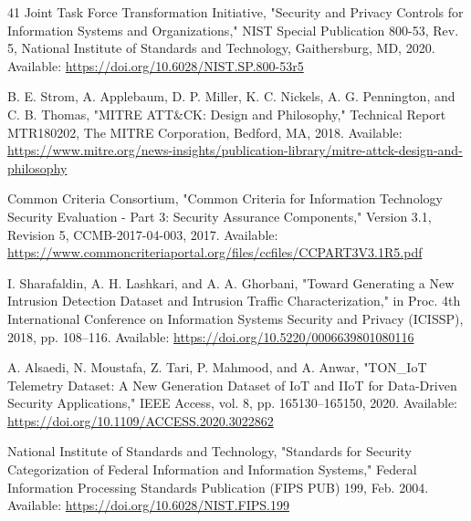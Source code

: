 \documentclass[journal,10pt,onecolumn]{IEEEtran}
\begin{document}
\begin{thebibliography}{41}
 Joint Task Force Transformation Initiative, "Security and Privacy Controls for Information Systems and Organizations," NIST Special Publication 800-53, Rev. 5, National Institute of Standards and Technology, Gaithersburg, MD, 2020. Available: \url{https://doi.org/10.6028/NIST.SP.800-53r5}

 B. E. Strom, A. Applebaum, D. P. Miller, K. C. Nickels, A. G. Pennington, and C. B. Thomas, "MITRE ATT&CK: Design and Philosophy," Technical Report MTR180202, The MITRE Corporation, Bedford, MA, 2018. Available: \url{https://www.mitre.org/news-insights/publication-library/mitre-attck-design-and-philosophy}

 Common Criteria Consortium, "Common Criteria for Information Technology Security Evaluation - Part 3: Security Assurance Components," Version 3.1, Revision 5, CCMB-2017-04-003, 2017. Available: \url{https://www.commoncriteriaportal.org/files/ccfiles/CCPART3V3.1R5.pdf}

 I. Sharafaldin, A. H. Lashkari, and A. A. Ghorbani, "Toward Generating a New Intrusion Detection Dataset and Intrusion Traffic Characterization," in Proc. 4th International Conference on Information Systems Security and Privacy (ICISSP), 2018, pp. 108–116. Available: \url{https://doi.org/10.5220/0006639801080116}

 A. Alsaedi, N. Moustafa, Z. Tari, P. Mahmood, and A. Anwar, "TON_IoT Telemetry Dataset: A New Generation Dataset of IoT and IIoT for Data-Driven Security Applications," IEEE Access, vol. 8, pp. 165130–165150, 2020. Available: \url{https://doi.org/10.1109/ACCESS.2020.3022862}

 National Institute of Standards and Technology, "Standards for Security Categorization of Federal Information and Information Systems," Federal Information Processing Standards Publication (FIPS PUB) 199, Feb. 2004. Available: \url{https://doi.org/10.6028/NIST.FIPS.199}


\end{thebibliography}
\end{document}
